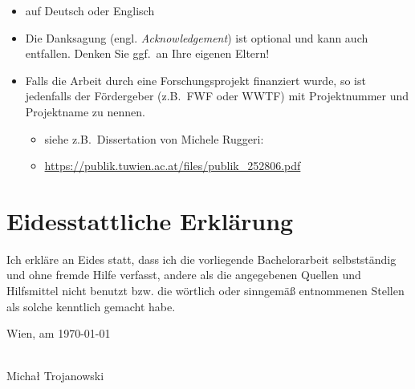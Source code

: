\documentclass[a4paper,11pt,bibliography=totoc,listof=totoc,headinclude=true,cleardoublepage=empty,oneside]{scrbook}
\begin{document}
{\color{change}
\begin{itemize}
\item auf Deutsch oder Englisch
\item Die Danksagung (engl. {\em Acknowledgement}) ist optional und kann auch entfallen. Denken Sie ggf.\ an Ihre eigenen Eltern!

\item Falls die Arbeit durch eine Forschungsprojekt finanziert wurde, so ist jedenfalls der Fördergeber (z.B.\ FWF oder WWTF) mit Projektnummer und Projektname zu nennen.
\begin{itemize}
\item siehe z.B.\ Dissertation von Michele Ruggeri:
\item[] \href{https://publik.tuwien.ac.at/files/publik_252806.pdf}{\ttfamily https://publik.tuwien.ac.at/files/publik\_252806.pdf}
\end{itemize}

\end{itemize}
}

\cleardoublepage


\chapter*{Eidesstattliche Erkl\"arung}
\thispagestyle{empty}
\thispagestyle{empty}

\vspace*{2cm}

Ich erkl\"are an Eides statt, dass ich die vorliegende Bachelorarbeit selbstst\"andig und ohne fremde Hilfe verfasst, andere als die angegebenen Quellen und Hilfsmittel nicht benutzt bzw. die w\"ortlich oder sinngem\"a{\ss} entnommenen Stellen als solche kenntlich gemacht habe.

\vspace*{3cm}

\noindent
Wien, am \today
%
\hfill 
%
\begin{minipage}[t]{5cm}
\centering
\underline{\hspace*{5cm}}\\
\small{Michał Trojanowski}
\end{minipage}
\end{document}
